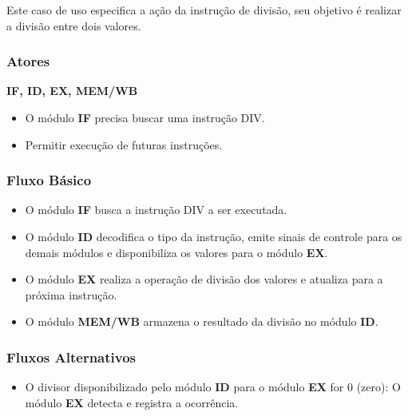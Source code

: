 
Este caso de uso especifica a ação da instrução de divisão, seu objetivo é realizar a divisão entre dois valores.
 
\subsubsection*{Atores}
\textbf{IF, ID, EX, MEM/WB}

\preconditions 
\begin{itemize}
 \item O módulo \textbf{IF} precisa buscar uma instrução DIV.
\end{itemize}

\postconditions
\begin{itemize}	
  \item Permitir execução de futuras instruções.
\end{itemize}

\subsubsection*{Fluxo Básico}
\begin{itemize}
\item O módulo \textbf{IF} busca a instrução DIV a ser executada.
\item O módulo \textbf{ID} decodifica o tipo da instrução, emite sinais de controle para os demais módulos e disponibiliza os valores para o módulo \textbf{EX}.
\item O módulo \textbf{EX} realiza a operação de divisão dos valores e atualiza para a próxima instrução.
\item O módulo \textbf{MEM/WB} armazena o resultado da divisão no módulo \textbf{ID}.
\end{itemize}

\subsubsection*{Fluxos Alternativos}
\begin{itemize}
\item O divisor disponibilizado pelo módulo \textbf{ID} para o módulo \textbf{EX} for 0 (zero):
\subitem O módulo \textbf{EX} detecta e registra a ocorrência.
\end{itemize}

%		


